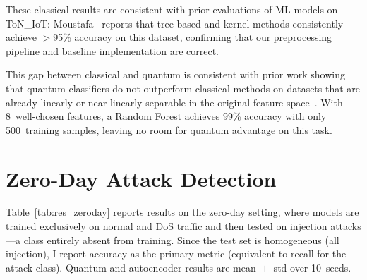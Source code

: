 These classical results are consistent with prior evaluations of ML models on ToN\_IoT: Moustafa~\cite{moustafa2021toniot} reports that tree-based and kernel methods consistently achieve $>$95\% accuracy on this dataset, confirming that our preprocessing pipeline and baseline implementation are correct.

This gap between classical and quantum is consistent with prior work showing that quantum classifiers do not outperform classical methods on datasets that are already linearly or near-linearly separable in the original feature space~\cite{schuld2021effect, bowles2024better}. With 8~well-chosen features, a Random Forest achieves 99\% accuracy with only 500~training samples, leaving no room for quantum advantage on this task.

\section{Zero-Day Attack Detection}
\label{sec:res_zeroday}

Table~\ref{tab:res_zeroday} reports results on the zero-day setting, where models are trained exclusively on normal and DoS traffic and then tested on injection attacks---a class entirely absent from training. Since the test set is homogeneous (all injection), I report accuracy as the primary metric (equivalent to recall for the attack class). Quantum and autoencoder results are mean~$\pm$~std over 10~seeds.

